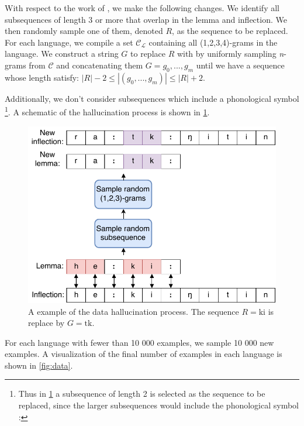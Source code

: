 \documentclass[11pt,a4paper]{article}
\begin{document}
With respect to the work of \citet{DBLP:conf/emnlp/AnastasopoulosN19},
we make the following changes. We identify all subsequences of length
$3$ or more that overlap in the lemma and inflection. We then randomly
sample one of them, denoted $R$, as the sequence to be replaced.  For
each language, we compile a set $\mathcal{C_L}$ containing all
(1,2,3,4)-grams in the language. We construct a string $G$ to replace
$R$ with by uniformly sampling \textit{n}-grams from $\mathcal{C}$ and
concatenating them $G = g_0, ..., g_m$ until we have a sequence whose
length satisfy: $|R|-2 \leq |(g_0, ..., g_m)| \leq |R|+2$.



Additionally, we don't consider subsequences which include a
phonological symbol \footnote{Thus in \cref{fig:hall} a subsequence of
length 2 is selected as the sequence to be replaced, since the larger subsequences
would include the phonological symbol :}.  A schematic of the hallucination
process is shown in \cref{fig:hall}.


\begin{figure}[h]
\centering
\includegraphics[scale=0.5]{hall.pdf}
\caption{\label{fig:hall} A example of the data hallucination process. The sequence $R=\text{ki}$ is replace by $G=\text{tk}$.}
\end{figure}


For each language with fewer than 10 000 examples, we sample 10 000
new examples. A visualization of the final number of examples in each
language is shown in \cref{fig:data}.
\end{document}
